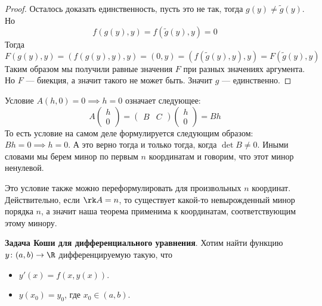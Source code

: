 \begin{proof}
  Осталось доказать единственность, пусть это не так, тогда $g(y) \neq \widetilde{g}(y)$. Но 
  \begin{equation*}
    f(g(y), y) = f(\widetilde{g}(y), y) = 0
  \end{equation*}
  Тогда 
  \begin{equation*}
    F(g(y), y) = (f(g(y), y), y) = (0, y) = (f(\widetilde{g}(y), y), y) = F(\widetilde{g}(y), y)
  \end{equation*}
  Таким образом мы получили равные значения $F$ при разных значениях аргумента. Но $F$ --- биекция, а значит такого не может быть. Значит $g$ --- единственно.
\end{proof}

\notice \; Условие $A(h, 0) = 0 \implies h = 0$ означает следующее:
\begin{equation*}
  A \begin{pmatrix}
    h \\ 0
  \end{pmatrix}
  =
  \begin{pmatrix}
    B & C
  \end{pmatrix}
  \begin{pmatrix}
    h \\ 0
  \end{pmatrix}
  =
  Bh
\end{equation*}
То есть условие на самом деле формулируется следующим образом: $Bh = 0 \implies h = 0$. А это верно тогда и только тогда, когда $\det B \neq 0$. Иными словами мы берем минор по первым $n$ координатам и говорим, что этот минор ненулевой.

\notice \; Это условие также можно переформулировать для произвольных $n$ координат. Действительно, если $\rk A = n$, то существует какой-то невырожденный минор порядка $n$, а значит наша теорема применима к координатам, соответствующим этому минору.

\begin{conj}
  \textbf{Задача Коши для дифференциального уравнения}. Хотим найти функцию $y\colon (a, b) \to \R$ дифференцируемую такую, что
  \begin{itemize}
    \item $y'(x) = f(x, y(x))$.
    \item $y(x_0) = y_0$, где $x_0 \in (a, b)$.
  \end{itemize}
\end{conj}


